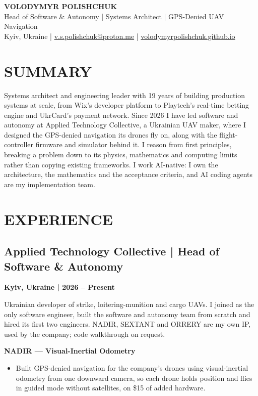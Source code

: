 \documentclass[11pt,a4paper]{article}
\providecommand{\phone}{}
\newcommand{\role}[3]{\Needspace*{6\baselineskip}\subsection*{#1 | #2}\textbf{#3}\par}
\newcommand{\project}[1]{\Needspace*{4\baselineskip}\textbf{#1}\par}
\begin{document}
\begin{center}
{\Huge \textbf{VOLODYMYR POLISHCHUK}}\\[0.5em]
{\Large Head of Software \& Autonomy | Systems Architect | GPS-Denied UAV Navigation}\\[0.5em]
Kyiv, Ukraine |%
\ifdefempty{\phone}{}{ \phone\ |}%
{} \href{mailto:v.s.polishchuk@proton.me}{v.s.polishchuk@proton.me} |%
{} \href{https://volodymyrpolishchuk.github.io}{volodymyrpolishchuk.github.io}
\end{center}
\vspace{1em}

\section*{SUMMARY}
Systems architect and engineering leader with 19 years of building production systems at scale, from Wix's developer platform to Playtech's real-time betting engine and UkrCard's payment network. Since 2026 I have led software and autonomy at Applied Technology Collective, a Ukrainian UAV maker, where I designed the GPS-denied navigation its drones fly on, along with the flight-controller firmware and simulator behind it. I reason from first principles, breaking a problem down to its physics, mathematics and computing limits rather than copying existing frameworks. I work AI-native: I own the architecture, the mathematics and the acceptance criteria, and AI coding agents are my implementation team.

\section*{EXPERIENCE}

\role{Applied Technology Collective}{Head of Software \& Autonomy}{Kyiv, Ukraine | 2026 -- Present}
Ukrainian developer of strike, loitering-munition and cargo UAVs. I joined as the only software engineer, built the software and autonomy team from scratch and hired its first two engineers. NADIR, SEXTANT and ORRERY are my own IP, used by the company; code walkthrough on request.

\project{NADIR --- Visual-Inertial Odometry}
\begin{itemize}
    \item Built GPS-denied navigation for the company's drones using visual-inertial odometry from one downward camera, so each drone holds position and flies in guided mode without satellites, on \$15 of added hardware.
\end{itemize}
\end{document}
